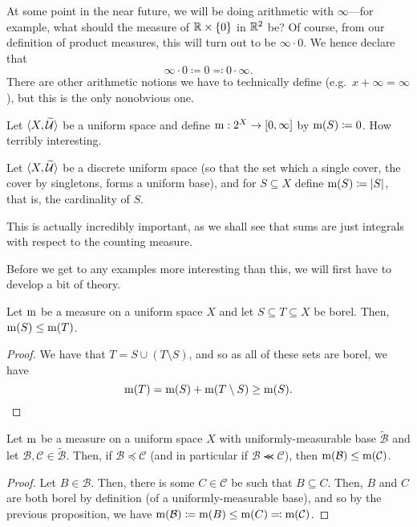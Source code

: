 \begin{displayquote}
At some point in the near future, we will be doing arithmetic with $\infty$---for example, what should the measure of $\mathbb{R} \times \{ 0\}$ in $\mathbb{R} ^2$ be?  Of course, from our definition of product measures, this will turn out to be $\infty \cdot 0$.  We hence declare that
\begin{equation}
\infty \cdot 0\coloneqq 0\eqqcolon 0\cdot \infty .
\end{equation}
There are other arithmetic notions we have to technically define (e.g.~$x+\infty=\infty$), but this is the only nonobvious one.
\end{displayquote}
\begin{exm}
Let $\langle X,\widetilde{\mathcal{U}}\rangle$ be a uniform space and define $\mathrm{m} :2^X\rightarrow [0,\infty ]$ by $\mathrm{m} (S)\coloneqq 0$.  How terribly interesting.
\end{exm}
\begin{exm}
Let $\langle X,\widetilde{\mathcal{U}}\rangle$ be a discrete uniform space (so that the set which a single cover, the cover by singletons, forms a uniform base), and for $S\subseteq X$ define $\mathrm{m} (S)\coloneqq \lvert S\rvert$, that is, the cardinality of $S$.
\begin{rmk}
This is actually incredibly important, as we shall see that sums are just integrals with respect to the counting measure.
\end{rmk}
\end{exm}
Before we get to any examples more interesting than this, we will first have to develop a bit of theory.
\begin{prp}
Let $\mathrm{m}$ be a measure on a uniform space $X$ and let $S\subseteq T\subseteq X$ be borel.  Then, $\mathrm{m} (S)\leq \mathrm{m} (T)$.
\begin{proof}
We have that $T=S\cup (T\setminus S)$, and so as all of these sets are borel, we have
\begin{equation}
\mathrm{m} (T)=\mathrm{m} (S)+\mathrm{m} (T\setminus S)\geq \mathrm{m} (S).
\end{equation}
\end{proof}
\end{prp}
\begin{prp}
Let $\mathrm{m}$ be a measure on a uniform space $X$ with uniformly-measurable base $\widetilde{\mathcal{B}}$ and let $\mathcal{B},\mathcal{C}\in \widetilde{\mathcal{B}}$.  Then, if $\mathcal{B}\preceq \mathcal{C}$ (and in particular if $\mathcal{B}\llcurly \mathcal{C}$), then $\mathrm{m} (\mathcal{B})\leq \mathrm{m} (\mathcal{C})$.
\begin{proof}
Let $B\in \mathcal{B}$.  Then, there is some $C\in \mathcal{C}$ be such that $B\subseteq C$.  Then, $B$ and $C$ are both borel by definition (of a uniformly-measurable base), and so by the previous proposition, we have $\mathrm{m} (\mathcal{B})\coloneqq \mathrm{m} (B)\leq \mathrm{m} (C)\eqqcolon \mathrm{m} (\mathcal{C})$.
\end{proof}
\end{prp}
